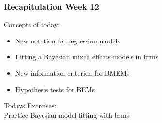\documentclass{beamer}
\begin{document}
\begin{frame}
    \frametitle{Recapitulation Week 12}
    Concepts of today:
    \begin{itemize}
        \item New notation for regression models
        \item Fitting a Bayesian mixed effects models in brms
        \item New information criterion for BMEMs
        \item Hypothesis tests for BEMs
    \end{itemize}
    \vspace{0.3cm}
    
    Todays Exercises:\\
    Practice Bayesian model fitting with brms
\end{frame}
\end{document}
